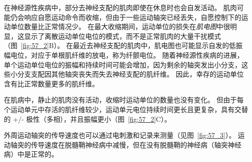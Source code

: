 在神经源性疾病中，部分去神经支配的肌肉即使在休息时也会自发活动。
肌肉可能仍会响应自愿运动命令而收缩，但由于一些运动轴突已经丢失，自愿控制下的运动单位数量比正常情况少。
在最大收缩期间，运动单位的损失在\textit{肌电图}中很明显，这显示了离散运动单位电位的模式，而不是正常肌肉的大量干扰模式（图~\ref{fig:57_2}B）。
在最近去神经支配的肌肉中，肌电图也可能显示自发的低振幅电位，对应于单根肌纤维的放电，称为纤颤电位。
随着神经源性疾病的进展，单个运动单位电位的振幅和持续时间可能会增加，因为剩余的轴突发出小分支，这些小分支支配因其他轴突丧失而失去神经支配的肌纤维。
因此，幸存的运动单位含有比正常数量更多的肌纤维。


在肌病中，静止的肌肉没有活动，收缩时运动单位的数量也没有变化。
但由于每个运动单元中存活的肌纤维较少，运动单元电位持续时间更长且更复杂，具有交替的 +/- 极性（多相），并且振幅更小（图~\ref{fig:57_2}C）。


外周运动轴突的传导速度也可以通过电刺激和记录来测量（见图~\ref{fig:57_3}）。
运动轴突的传导速度在脱髓鞘神经病中减慢，但在没有脱髓鞘的神经病（轴突神经病）中是正常的。


